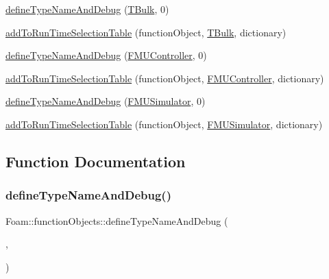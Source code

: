 \begin{DoxyCompactItemize}
\item 
\hyperlink{namespaceFoam_1_1functionObjects_aa5654f26f41b0e0637778be63ed0f3b5}{define\+Type\+Name\+And\+Debug} (\hyperlink{classFoam_1_1functionObjects_1_1TBulk}{T\+Bulk}, 0)
\item 
\hyperlink{namespaceFoam_1_1functionObjects_a696e515057b9506747adcc3106f107c7}{add\+To\+Run\+Time\+Selection\+Table} (function\+Object, \hyperlink{classFoam_1_1functionObjects_1_1TBulk}{T\+Bulk}, dictionary)
\item 
\hyperlink{namespaceFoam_1_1functionObjects_ada5db8bc54b45fd379be924b8378e80b}{define\+Type\+Name\+And\+Debug} (\hyperlink{classFoam_1_1functionObjects_1_1FMUController}{F\+M\+U\+Controller}, 0)
\item 
\hyperlink{namespaceFoam_1_1functionObjects_ac8cc89894c311a0bac16db8433c6995f}{add\+To\+Run\+Time\+Selection\+Table} (function\+Object, \hyperlink{classFoam_1_1functionObjects_1_1FMUController}{F\+M\+U\+Controller}, dictionary)
\item 
\hyperlink{namespaceFoam_1_1functionObjects_a84c47bc05d42fa7891948581e7155b97}{define\+Type\+Name\+And\+Debug} (\hyperlink{classFoam_1_1functionObjects_1_1FMUSimulator}{F\+M\+U\+Simulator}, 0)
\item 
\hyperlink{namespaceFoam_1_1functionObjects_a7b35781ec40f18d4094339da704c5998}{add\+To\+Run\+Time\+Selection\+Table} (function\+Object, \hyperlink{classFoam_1_1functionObjects_1_1FMUSimulator}{F\+M\+U\+Simulator}, dictionary)
\end{DoxyCompactItemize}


\subsection{Function Documentation}
\mbox{\label{namespaceFoam_1_1functionObjects_a2433b4c0711ea7e43bf24cc30445a30b}} 
\subsubsection{\texorpdfstring{define\+Type\+Name\+And\+Debug()}{defineTypeNameAndDebug()}\hspace{0.1cm}{\footnotesize\ttfamily [1/8]}}
{\footnotesize\ttfamily Foam\+::function\+Objects\+::define\+Type\+Name\+And\+Debug (\begin{DoxyParamCaption}\item[{\hyperlink{classFoam_1_1functionObjects_1_1fieldDiffExtents}{field\+Diff\+Extents}}]{,  }\item[{0}]{ }\end{DoxyParamCaption})}

